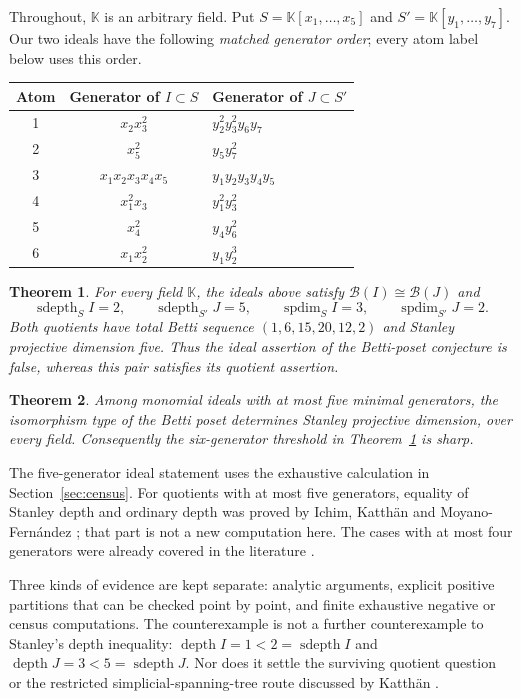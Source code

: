 \documentclass[11pt,a4paper]{article}
\newtheorem{theorem}{Theorem}[section]
\theoremstyle{remark}\newtheorem{remark}[theorem]{Remark}
\DeclareMathOperator{\sdepth}{sdepth}
\DeclareMathOperator{\spdim}{spdim}
\DeclareMathOperator{\depth}{depth}
\newcommand{\B}{\mathcal B}
\newcommand{\K}{\mathbb K}
\begin{document}
Throughout, $\K$ is an arbitrary field. Put $S=\K[x_1,\ldots,x_5]$ and $S'=\K[y_1,\ldots,y_7]$. Our two ideals have the following \emph{matched generator order}; every atom label below uses this order.
\begin{center}
\begin{tabular}{ccl}
\toprule Atom & Generator of $I\subset S$ & Generator of $J\subset S'$\\\midrule
1&$x_2x_3^2$&$y_2^2y_3^2y_6y_7$\\
2&$x_5^2$&$y_5y_7^2$\\
3&$x_1x_2x_3x_4x_5$&$y_1y_2y_3y_4y_5$\\
4&$x_1^2x_3$&$y_1^2y_3^2$\\
5&$x_4^2$&$y_4y_6^2$\\
6&$x_1x_2^2$&$y_1y_2^3$\\\bottomrule
\end{tabular}
\end{center}
\begin{theorem}\label{thm:main}
For every field $\K$, the ideals above satisfy $\B(I)\cong\B(J)$ and
\[
\sdepth_S I=2,\qquad \sdepth_{S'}J=5,
\qquad \spdim_S I=3,\qquad \spdim_{S'}J=2.
\]
Both quotients have total Betti sequence $(1,6,15,20,12,2)$ and Stanley projective dimension five. Thus the ideal assertion of the Betti-poset conjecture is false, whereas this pair satisfies its quotient assertion.
\end{theorem}
\begin{theorem}\label{thm:five}
Among monomial ideals with at most five minimal generators, the isomorphism type of the Betti poset determines Stanley projective dimension, over every field. Consequently the six-generator threshold in Theorem~\ref{thm:main} is sharp.
\end{theorem}
The five-generator ideal statement uses the exhaustive calculation in Section~\ref{sec:census}. For quotients with at most five generators, equality of Stanley depth and ordinary depth was proved by Ichim, Katth\"an and Moyano-Fern\'andez \cite[Theorem 1.2]{IKMF2016}; that part is not a new computation here. The cases with at most four generators were already covered in the literature \cite{Katthan2016,IKMF2016}.

Three kinds of evidence are kept separate: analytic arguments, explicit positive partitions that can be checked point by point, and finite exhaustive negative or census computations. The counterexample is not a further counterexample to Stanley's depth inequality: $\depth I=1<2=\sdepth I$ and $\depth J=3<5=\sdepth J$. Nor does it settle the surviving quotient question or the restricted simplicial-spanning-tree route discussed by Katth\"an \cite{Katthan2015,Katthan2016}.
\end{document}
